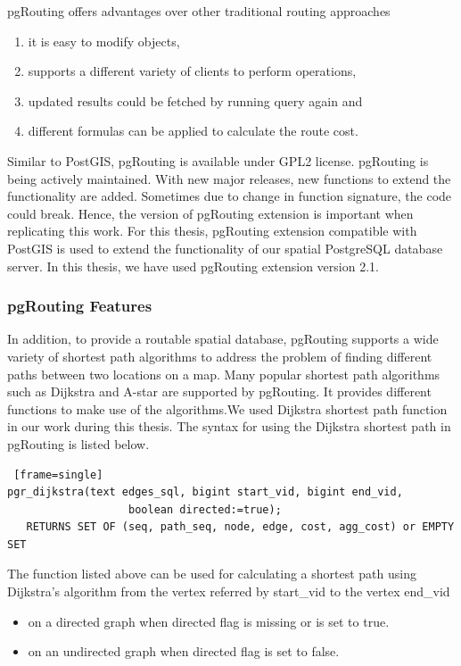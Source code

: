 pgRouting offers advantages over other traditional routing approaches \begin{enumerate}
\item it is easy to modify objects, 
\item supports a different variety of clients to perform operations, 
\item updated results could be fetched by running query again and 
\item different formulas can be applied to calculate the route cost.
\end{enumerate}

Similar to PostGIS, pgRouting is available under GPL2 license. pgRouting is being actively maintained. With new major releases, new functions to extend the functionality are added. Sometimes due to change in function signature, the code could break. Hence, the version of pgRouting extension is important when replicating this work. For this thesis, pgRouting extension compatible with PostGIS is used to extend the functionality of our spatial PostgreSQL database server. In this thesis, we have used pgRouting extension version 2.1. 


\subsubsection{pgRouting Features}
In addition, to provide a routable spatial database, pgRouting \cite{pgrouting} supports a wide variety of shortest path algorithms to address the problem of finding different paths between two locations on a map. Many popular shortest path algorithms such as Dijkstra and A-star are supported by pgRouting. It provides different functions to make use of the algorithms.We used Dijkstra shortest path function in our work during this thesis. The syntax for using the Dijkstra shortest path in pgRouting is listed below. 
\begin{lstlisting} [frame=single]
pgr_dijkstra(text edges_sql, bigint start_vid, bigint end_vid,
                   boolean directed:=true);
   RETURNS SET OF (seq, path_seq, node, edge, cost, agg_cost) or EMPTY SET
\end{lstlisting}
The function listed above can be used for calculating a shortest path using Dijkstra's algorithm from the vertex referred by start{\_}vid to the vertex end{\_}vid  
\begin{itemize}
\item	on a directed graph when directed flag is missing or is set to true.
\item	on an undirected graph when directed flag is set to false.
\end{itemize}

